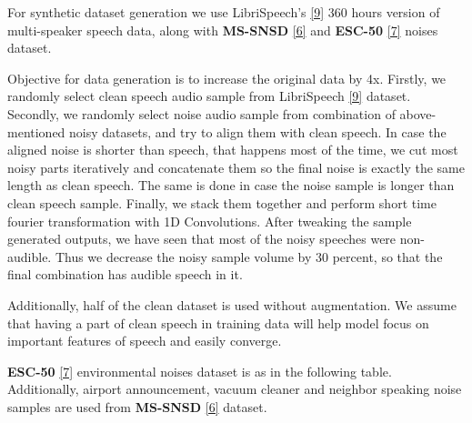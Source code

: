 \documentclass{article}
\begin{document}
\begin{flushleft}
For synthetic dataset generation we use LibriSpeech's \hyperlink{refer}{[9]} 360 hours version of multi-speaker speech data, along with \textbf{MS-SNSD} \hyperlink{refer}{[6]} and \textbf{ESC-50} \hyperlink{refer}{[7]} noises dataset. 

Objective for data generation is to increase the original data by 4x. 
Firstly, we randomly select clean speech audio sample from LibriSpeech \hyperlink{refer}{[9]} dataset. 
Secondly, we randomly select noise audio sample from combination of above-mentioned noisy datasets, and try to align them with clean speech. In case the aligned noise is shorter than speech, that happens most of the time, we cut most noisy parts iteratively and concatenate them so the final noise is exactly the same length as clean speech. The same is done in case the noise sample is longer than clean speech sample. 
Finally, we stack them together and perform short time fourier transformation with 1D Convolutions.  After tweaking the sample generated outputs, we have seen that most of the noisy speeches were non-audible. Thus we decrease the noisy sample volume by 30 percent, so that the final combination has audible speech in it.

Additionally, half of the clean dataset is used without augmentation. We assume that having a part of clean speech in training data will help model focus on important features of speech and easily converge.
\end{flushleft}

\begin{flushleft}
\textbf{ESC-50} \hyperlink{refer}{[7]} environmental noises dataset is as in the following table. Additionally, airport announcement, vacuum cleaner and neighbor speaking noise samples are used from \textbf{MS-SNSD} \hyperlink{refer}{[6]} dataset.
\end{flushleft}
\end{document}
